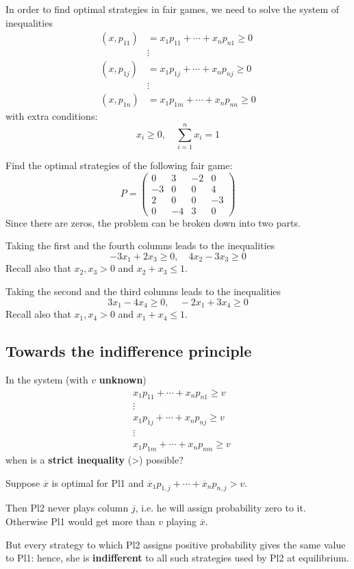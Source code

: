 \documentclass[../main.tex]{subfiles}
\begin{document}
In order to find optimal strategies in fair games, we need to solve the system of inequalities
\begin{align*}
    (x, p_{11}) & = x_1 p_{11} + \cdots + x_n p_{n1} \geq 0 \\
                & \vdots                                    \\
    (x, p_{1j}) & = x_1 p_{1j} + \cdots + x_n p_{nj} \geq 0 \\
                & \vdots                                    \\
    (x, p_{1n}) & = x_1 p_{1m} + \cdots + x_n p_{nn} \geq 0
\end{align*}
with extra conditions:
\[
    x_i \geq 0, \quad \sum_{i=1}^n x_i = 1
\]
\begin{example}
    Find the optimal strategies of the following fair game:
    \[
        P = \begin{pmatrix}
            0  & 3  & -2 & 0  \\
            -3 & 0  & 0  & 4  \\
            2  & 0  & 0  & -3 \\
            0  & -4 & 3  & 0
        \end{pmatrix}
    \]
    Since there are zeros, the problem can be broken down into two parts.

    Taking the first and the fourth columns leads to the inequalities
    \[
        -3 x_1 + 2 x_3 \geq 0, \quad 4 x_2 - 3 x_3 \geq 0
    \]
    Recall also that $x_2, x_3 > 0$ and $x_2 + x_3 \leq 1$.

    Taking the second and the third columns leads to the inequalities
    \[
        3 x_1 - 4 x_4 \geq 0, \quad -2 x_1 + 3 x_4 \geq 0
    \]
    Recall also that $x_1, x_4 > 0$ and $x_1 + x_4 \leq 1$.
\end{example}

\subsection{Towards the indifference principle}
In the system (with $v$ \textbf{unknown})
\begin{align*}
     & x_1 p_{11} + \cdots + x_n p_{n1} \geq v \\
     & \vdots                                  \\
     & x_1 p_{1j} + \cdots + x_n p_{nj} \geq v \\
     & \vdots                                  \\
     & x_1 p_{1m} + \cdots + x_n p_{nm} \geq v
\end{align*}
when is a \textbf{strict inequality} (>) possible?

Suppose $\overline{x}$ is optimal for Pl1 and $\overline{x}_1 p_{1,j} + \cdots + \overline{x}_n p_{n,j} > v$.

Then Pl2 never plays column $j$, i.e. he will assign probability zero to it. Otherwise Pl1 would get more than $v$ playing $\overline{x}$.

But every strategy to which Pl2 assigns positive probability gives the same value
to Pl1: hence, she is \textbf{indifferent} to all such strategies used by Pl2 at equilibrium.
\end{document}
